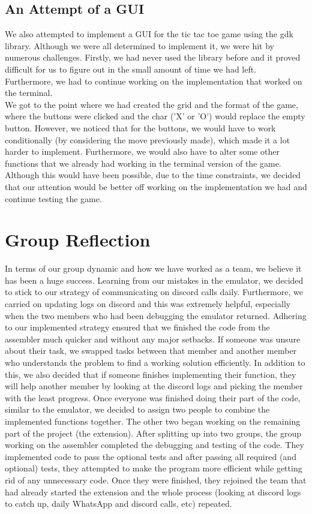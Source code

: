 \documentclass[10pt]{article}
\begin{document}
\subsection{An Attempt of a GUI}
We also attempted to implement a GUI for the tic tac toe game using the gdk library. Although we were all determined to implement it, we were hit by numerous challenges. Firstly, we had never used the library before and it proved difficult for us to figure out in the small amount of time we had left. Furthermore, we had to continue working on the implementation that worked on the terminal.
\\We got to the point where we had created the grid and the format of the game, where the buttons were clicked and the char ('X' or 'O') would replace the empty button. However, we noticed that for the buttons, we would have to work conditionally (by considering the move previously made), which made it a lot harder to implement. Furthermore, we would also have to alter some other functions that we already had working in the terminal version of the game. Although this would have been possible, due to the time constraints, we decided that our attention would be better off working on the implementation we had and continue testing the game. 

\section{Group Reflection}
In terms of our group dynamic and how we have worked as a team, we believe it has been a huge success. Learning from our mistakes in the emulator, we decided to stick to our strategy of communicating on discord calls daily. Furthermore, we carried on updating logs on discord and this was extremely helpful, especially when the two members who had been debugging the emulator returned. Adhering to our implemented strategy ensured that we finished the code from the assembler much quicker and without any major setbacks. If someone was unsure about their task, we swapped tasks between that member and another member who understands the problem to find a working solution efficiently. In addition to this, we also decided that if someone finishes implementing their function, they will help another member by looking at the discord logs and picking the member with the least progress. Once everyone was finished doing their part of the code, similar to the emulator, we decided to assign two people to combine the implemented functions together. The other two began working on the remaining part of the project (the extension). After splitting up into two groups, the group working on the assembler completed the debugging and testing of the code. They implemented code to pass the optional tests and after passing all required (and optional) tests, they attempted to make the program more efficient while getting rid of any unnecessary code. Once they were finished, they rejoined the team that had already started the extension and the whole process (looking at discord logs to catch up, daily WhatsApp and discord calls, etc) repeated.
\end{document}
